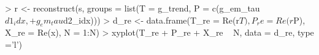 \begin{CodeChunk}
\begin{CodeInput}


> r <- reconstruct(s, groups = list(T = g_trend, P = c(g_em_tau$d1_idx, 
+                                                      g_em_tau$d2_idx)))
> d_re <- data.frame(T_re = Re(r$T), P_re = Re(r$P),  X_re = Re(x), N = 1:N)
> xyplot(T_re + P_re + X_re  ~ N, data = d_re, type ='l')
\end{CodeInput}

\end{CodeChunk}